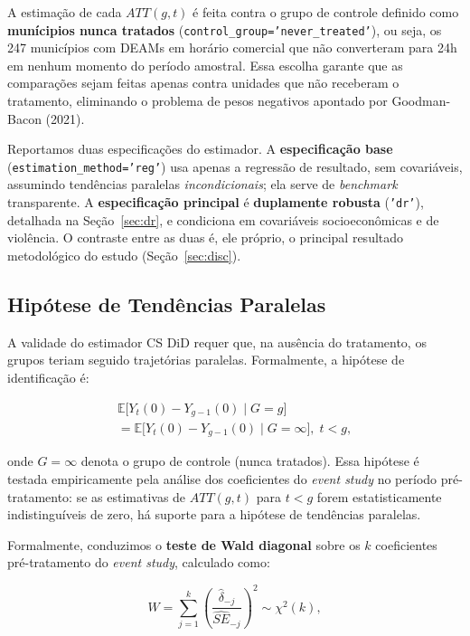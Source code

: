 \documentclass[twocolumn, 10pt]{article}
\begin{document}
A estimação de cada $ATT(g,t)$ é feita contra o grupo de controle definido como
\textbf{munícipios nunca tratados} (\texttt{control\_group='never\_treated'}),
ou seja, os 247 municípios com DEAMs em horário comercial que não converteram
para 24h em nenhum momento do período amostral. Essa escolha garante que
as comparações sejam feitas apenas contra unidades que não receberam o
tratamento, eliminando o problema de pesos negativos apontado por
Goodman-Bacon (2021).

Reportamos duas especificações do estimador. A \textbf{especificação base}
(\texttt{estimation\_method='reg'}) usa apenas a regressão de resultado, sem
covariáveis, assumindo tendências paralelas \textit{incondicionais}; ela serve
de \textit{benchmark} transparente. A \textbf{especificação principal} é
\textbf{duplamente robusta} (\texttt{'dr'}), detalhada na
Seção~\ref{sec:dr}, e condiciona em covariáveis socioeconômicas e de violência.
O contraste entre as duas é, ele próprio, o principal resultado metodológico do
estudo (Seção~\ref{sec:disc}).

\subsection{Hipótese de Tendências Paralelas}

A validade do estimador CS DiD requer que, na ausência do tratamento, os grupos
teriam seguido trajetórias paralelas. Formalmente, a hipótese de identificação é:

\begin{equation}
\begin{split}
\mathbb{E}\bigl[Y_t(0) - Y_{g-1}(0) \mid G = g\bigr] \\
= \mathbb{E}\bigl[Y_t(0) - Y_{g-1}(0) \mid G = \infty\bigr],\; t < g,
\end{split}
\label{eq:parallel_trends}
\end{equation}

\noindent onde $G = \infty$ denota o grupo de controle (nunca tratados). Essa
hipótese é testada empiricamente pela análise dos coeficientes do \textit{event
study} no período pré-tratamento: se as estimativas de $ATT(g,t)$ para $t < g$
forem estatisticamente indistinguíveis de zero, há suporte para a hipótese de
tendências paralelas.

Formalmente, conduzimos o \textbf{teste de Wald diagonal} sobre os $k$
coeficientes pré-tratamento do \textit{event study}, calculado como:

\begin{equation}
W = \sum_{j=1}^{k} \left(\frac{\hat{\delta}_{-j}}{\widehat{SE}_{-j}}\right)^2
\sim \chi^2(k),
\label{eq:wald}
\end{equation}
\end{document}
